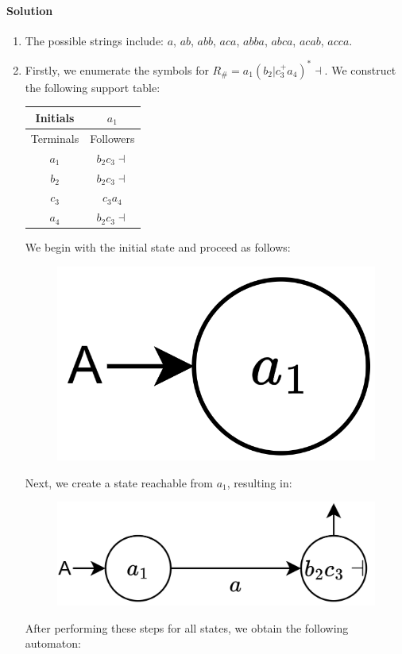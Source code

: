 \paragraph*{Solution}
\begin{enumerate}
    \item The possible strings include: $a$, $ab$, $abb$, $aca$, $abba$, $abca$, $acab$, $acca$. 
    \item Firstly, we enumerate the symbols for $R_{\#}=a_1\left( b_2|c^{+}_{3}a_4 \right)^{*}\dashv$. 
        We construct the following support table:
        \begin{table}[H]
            \centering
            \begin{tabular}{cc}
            Initials                       & $a_1$             \\ \hline
            \multicolumn{1}{c|}{Terminals} & Followers         \\
            \multicolumn{1}{c|}{$a_1$}     & $b_2c_3\dashv$ \\
            \multicolumn{1}{c|}{$b_2$}     & $b_2c_3\dashv$  \\
            \multicolumn{1}{c|}{$c_3$}     & $c_3a_4$         \\
            \multicolumn{1}{c|}{$a_4$}     & $b_2c_3\dashv$ 
            \end{tabular}
        \end{table}
        We begin with the initial state and proceed as follows:
        \begin{figure}[H]
            \centering
            \includegraphics[width=0.2\linewidth]{images/FSA1.png}
        \end{figure}
        Next, we create a state reachable from $a_1$, resulting in:
        \begin{figure}[H]
            \centering
            \includegraphics[width=0.4\linewidth]{images/FSA2.png}
        \end{figure}
        After performing these steps for all states, we obtain the following automaton:
        \begin{figure}[H]

\end{figure}
\end{enumerate}
